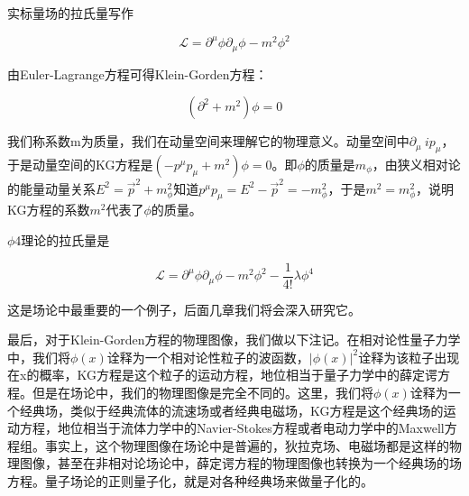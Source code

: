 实标量场的拉氏量写作

\begin{equation}
    \mathcal{L}=\partial^\mu\phi\partial_\mu\phi-m^2\phi^2
\end{equation}

由Euler-Lagrange方程可得Klein-Gorden方程：

\begin{equation}\label{KG eq}
    (\partial^2+m^2)\phi=0
\end{equation}

我们称系数m为质量，我们在动量空间来理解它的物理意义。动量空间中$\partial_\mu~ip_\mu$，于是动量空间的KG方程是$(-p^\mu p_\mu+m^2)\phi=0$。即$\phi$的质量是$m_\phi$，由狭义相对论的能量动量关系$E^2=\vec{p}^2+m_\phi^2$知道$p^\mu p_\mu=E^2-\vec{p}^2=-m_\phi^2$，于是$m^2=m_\phi^2$，说明KG方程的系数$m^2$代表了$\phi$的质量。

$\phi$4理论的拉氏量是

\begin{equation}
    \mathcal{L}=\partial^\mu\phi\partial_\mu\phi-m^2\phi^2-\frac{1}{4!}\lambda\phi^4
\end{equation}

这是场论中最重要的一个例子，后面几章我们将会深入研究它。

最后，对于Klein-Gorden方程的物理图像，我们做以下注记。在相对论性量子力学中，我们将$\phi(x)$诠释为一个相对论性粒子的波函数，$|\phi(x)|^2$诠释为该粒子出现在x的概率，KG方程是这个粒子的运动方程，地位相当于量子力学中的薛定谔方程。但是在场论中，我们的物理图像是完全不同的。这里，我们将$\phi(x)$诠释为一个经典场，类似于经典流体的流速场或者经典电磁场，KG方程是这个经典场的运动方程，地位相当于流体力学中的Navier-Stokes方程或者电动力学中的Maxwell方程组。事实上，这个物理图像在场论中是普遍的，狄拉克场、电磁场都是这样的物理图像，甚至在非相对论场论中，薛定谔方程的物理图像也转换为一个经典场的场方程。量子场论的正则量子化，就是对各种经典场来做量子化的。